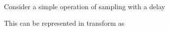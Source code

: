 Consider a simple operation of sampling with a delay
  \begin{center}
  \end{center}
This can be represented in transform as
  \begin{center}
  \end{center}
\endinput
